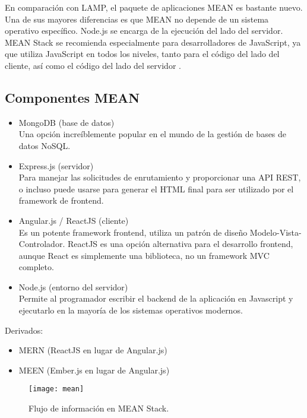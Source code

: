 En comparación con LAMP, el paquete de aplicaciones MEAN es bastante nuevo. Una de sus mayores diferencias es que MEAN no depende de un sistema operativo específico. Node.js se encarga de la ejecución del lado del servidor. MEAN Stack se recomienda especialmente para desarrolladores de JavaScript, ya que utiliza JavaScript en todos los niveles, tanto para el código del lado del cliente, así como el código del lado del servidor \cite{srinivasan}.
\vspace{0.8cm}

\subsection{Componentes MEAN}
\begin{itemize}
  \item MongoDB (base de datos)\\
  Una opción increíblemente popular en el mundo de la gestión de bases de datos NoSQL.
  \item Express.js (servidor)\\
  Para manejar las solicitudes de enrutamiento y proporcionar una API REST, o incluso puede usarse para generar el HTML final para ser utilizado por el framework de \gls{frontend}.
  \item Angular.js / ReactJS (cliente)\\
  Es un potente framework \gls{frontend}, utiliza un patrón de diseño Modelo-Vista-Controlador. ReactJS es una opción alternativa para el desarrollo \gls{frontend}, aunque React es simplemente una biblioteca, no un framework MVC completo.
  \item Node.js (entorno del servidor)\\
  Permite al programador escribir el \gls{backend} de la aplicación en Javascript y ejecutarlo en la mayoría de los sistemas operativos modernos.
\end{itemize}

Derivados:

\begin{itemize}
  \item MERN (ReactJS en lugar de Angular.js)
  \item MEEN (Ember.js en lugar de Angular.js)
\end{itemize} 

\begin{figure}[H]
  \centering
  \texttt{[image: mean]}
  \caption{Flujo de información en MEAN Stack.}
\end{figure}

